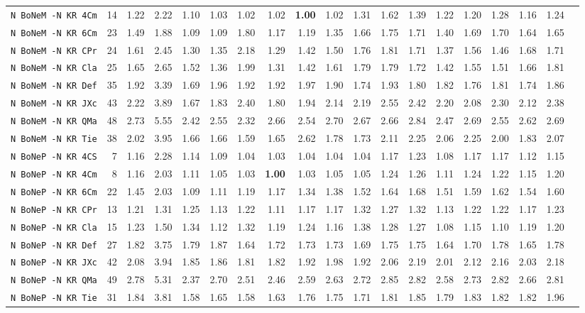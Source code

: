 \begin{tabular}{l | r @{~~} r | r@{~~}r@{~~}r@{~~}r@{~~}r@{~~}r@{~~}r@{~~}r@{~~}r@{~~}r@{~~}r@{~~}r@{~~}r@{~~}r@{~~}r@{~~}r|}
\verb+N BoNeM -N KR 4Cm+ & 14 & 1.22 & 2.22&1.10&1.03&1.02&1.02&\textbf{1.00}&1.02&1.31&1.62&1.39&1.22&1.20&1.28&1.16&1.24\\
\verb+N BoNeM -N KR 6Cm+ & 23 & 1.49 & 1.88&1.09&1.09&1.80&1.17&1.19&1.35&1.66&1.75&1.71&1.40&1.69&1.70&1.64&1.65\\
\verb+N BoNeM -N KR CPr+ & 24 & 1.61 & 2.45&1.30&1.35&2.18&1.29&1.42&1.50&1.76&1.81&1.71&1.37&1.56&1.46&1.68&1.71\\
\verb+N BoNeM -N KR Cla+ & 25 & 1.65 & 2.65&1.52&1.36&1.99&1.31&1.42&1.61&1.79&1.79&1.72&1.42&1.55&1.51&1.66&1.81\\
\verb+N BoNeM -N KR Def+ & 35 & 1.92 & 3.39&1.69&1.96&1.92&1.92&1.97&1.90&1.74&1.93&1.80&1.82&1.76&1.81&1.74&1.86\\
\verb+N BoNeM -N KR JXc+ & 43 & 2.22 & 3.89&1.67&1.83&2.40&1.80&1.94&2.14&2.19&2.55&2.42&2.20&2.08&2.30&2.12&2.38\\
\verb+N BoNeM -N KR QMa+ & 48 & 2.73 & 5.55&2.42&2.55&2.32&2.66&2.54&2.70&2.67&2.66&2.84&2.47&2.69&2.55&2.62&2.69\\
\verb+N BoNeM -N KR Tie+ & 38 & 2.02 & 3.95&1.66&1.66&1.59&1.65&2.62&1.78&1.73&2.11&2.25&2.06&2.25&2.00&1.83&2.07\\
\verb+N BoNeP -N KR 4CS+ & 7 & 1.16 & 2.28&1.14&1.09&1.04&1.03&1.04&1.04&1.04&1.17&1.23&1.08&1.17&1.17&1.12&1.15\\
\verb+N BoNeP -N KR 4Cm+ & 8 & 1.16 & 2.03&1.11&1.05&1.03&\textbf{1.00}&1.03&1.05&1.05&1.24&1.26&1.11&1.24&1.22&1.15&1.20\\
\verb+N BoNeP -N KR 6Cm+ & 22 & 1.45 & 2.03&1.09&1.11&1.19&1.17&1.34&1.38&1.52&1.64&1.68&1.51&1.59&1.62&1.54&1.60\\
\verb+N BoNeP -N KR CPr+ & 13 & 1.21 & 1.31&1.25&1.13&1.22&1.11&1.17&1.17&1.32&1.27&1.32&1.13&1.22&1.22&1.17&1.23\\
\verb+N BoNeP -N KR Cla+ & 15 & 1.23 & 1.50&1.34&1.12&1.32&1.19&1.24&1.16&1.38&1.28&1.27&1.08&1.15&1.10&1.19&1.20\\
\verb+N BoNeP -N KR Def+ & 27 & 1.82 & 3.75&1.79&1.87&1.64&1.72&1.73&1.73&1.69&1.75&1.75&1.64&1.70&1.78&1.65&1.78\\
\verb+N BoNeP -N KR JXc+ & 42 & 2.08 & 3.94&1.85&1.86&1.81&1.82&1.92&1.98&1.92&2.06&2.19&2.01&2.12&2.16&2.03&2.18\\
\verb+N BoNeP -N KR QMa+ & 49 & 2.78 & 5.31&2.37&2.70&2.51&2.46&2.59&2.63&2.72&2.85&2.82&2.58&2.73&2.82&2.66&2.81\\
\verb+N BoNeP -N KR Tie+ & 31 & 1.84 & 3.81&1.58&1.65&1.58&1.63&1.76&1.75&1.71&1.81&1.85&1.79&1.83&1.82&1.82&1.96\\
\end{tabular}
